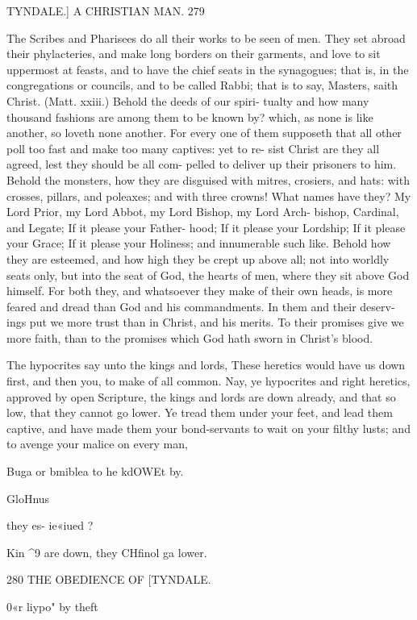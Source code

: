 \documentclass{custom}
\begin{document}
{TYNDALE.]
A CHRISTIAN MAN.
279

The Scribes and Pharisees do all their works to be 
seen of men. They set abroad their phylacteries, and 
make long borders on their garments, and love to sit 
uppermost at feasts, and to have the chief seats in the 
synagogues; that is, in the congregations or councils, 
and to be called Rabbi; that is to say, Masters, saith 
Christ. (Matt. xxiii.) Behold the deeds of our spiri- 
tualty and how many thousand fashions are among them 
to be known by? which, as none is like another, so loveth 
none another. For every one of them supposeth that all 
other poll too fast and make too many captives: yet to re- 
sist Christ are they all agreed, lest they should be all com- 
pelled to deliver up their prisoners to him. Behold the 
monsters, how they are disguised with mitres, crosiers, 
and hats: with crosses, pillars, and poleaxes; and with 
three crowns! What names have they? My Lord 
Prior, my Lord Abbot, my Lord Bishop, my Lord Arch- 
bishop, Cardinal, and Legate; If it please your Father- 
hood; If it please your Lordship; If it please your 
Grace; If it please your Holiness; and innumerable 
such like. Behold how they are esteemed, and how high 
they be crept up above all; not into worldly seats only, but 
into the seat of God, the hearts of men, where they sit 
above God himself. For both they, and whatsoever they 
make of their own heads, is more feared and dread than 
God and his commandments. In them and their deserv- 
ings put we more trust than in Christ, and his merits. To 
their promises give we more faith, than to the promises 
which God hath sworn in Christ's blood. 

The hypocrites say unto the kings and lords, These 
heretics would have us down first, and then you, to make 
of all common. Nay, ye hypocrites and right heretics, 
approved by open Scripture, the kings and lords are down 
already, and that so low, that they cannot go lower. Ye 
tread them under your feet, and lead them captive, and 
have made them your bond-servants to wait on your 
filthy lusts; and to avenge your malice on every man, 

Buga or 
bmiblea to 
he kdOWEt 
by. 

GloHnus 

they es- 
ie«iued ? 

Kin ^9 are 
down, they 
CHfinol ga 
lower. 


280
THE OBEDIENCE OF
[TYNDALE.

0«r liypo" 
by theft 

}
\end{document}
